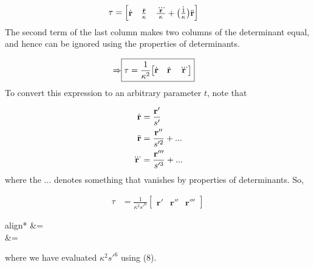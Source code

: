 \documentclass{article}
\begin{document}
\begin{flushleft}
	\begin{align*}
		\tau &= \begin{bmatrix}
		\dot{\mathbf{r}} & \frac{\ddot{\mathbf{r}}}{\kappa} & \frac{\dddot{\mathbf{r}}}{\kappa} + \dot{\left(\frac{1}{\kappa}\right)}\ddot{\mathbf{r}}
		\end{bmatrix}
	\end{align*}
	The second term of the last column makes two columns of
	the determinant equal, and hence can be ignored using the properties of determinants.
	
	\begin{align*}
		\Rightarrow \Aboxed{\tau &= \frac{1}{\kappa^{2}}{\begin{bmatrix}
		\VectDiff{r} & \ddot{\mathbf{r}} & \dddot{\mathbf{r}}
		\end{bmatrix}}}
	\end{align*}
	To convert this expression to an arbitrary parameter $t$, note that 
	
	\begin{align*}
		\dot{\mathbf{r}} &= \frac{\mathbf{r'}}{s'}\\
		\ddot{\mathbf{r}} &= \frac{\mathbf{r''}}{s'^{2}} + ...\\
		\dddot{\mathbf{r}} &= \frac{\mathbf{r'''}}{s'^{3}} + ...
	\end{align*}
	where the $...$ denotes something that vanishes by properties of determinants. So,
	
	\begin{align*}
		\tau &= \frac{1}{\kappa^{2}s'^{6}}\begin{bmatrix}
			\mathbf{r'} & \mathbf{r''} & \mathbf{r'''}
			\end{bmatrix}
	\end{align*}
	\begin{empheq}[box=\widefbox]{align*}
		\tau &=  \\
		\tau &= 
	\end{empheq}
	where we have evaluated $\kappa^{2}s'^{6}$ using (8).


	
	\end{flushleft}
\end{document}
